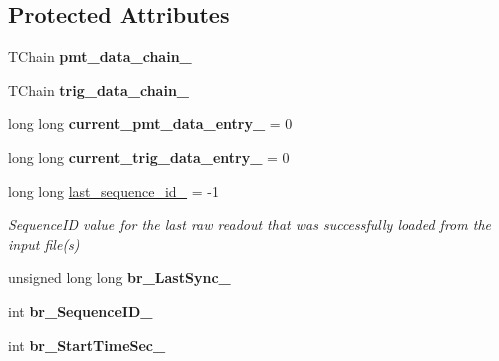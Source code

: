 \subsection*{Protected Attributes}
\begin{DoxyCompactItemize}
\item 
\hypertarget{classannie_1_1RawReader_a98cd23d90d4f3da64eb4a578e4f88593}{T\-Chain {\bfseries pmt\-\_\-data\-\_\-chain\-\_\-}}\label{classannie_1_1RawReader_a98cd23d90d4f3da64eb4a578e4f88593}

\item 
\hypertarget{classannie_1_1RawReader_abc8d869d88f8c0eaeefcebaada99ead9}{T\-Chain {\bfseries trig\-\_\-data\-\_\-chain\-\_\-}}\label{classannie_1_1RawReader_abc8d869d88f8c0eaeefcebaada99ead9}

\item 
\hypertarget{classannie_1_1RawReader_a74320bd489ace465896916242095a282}{long long {\bfseries current\-\_\-pmt\-\_\-data\-\_\-entry\-\_\-} = 0}\label{classannie_1_1RawReader_a74320bd489ace465896916242095a282}

\item 
\hypertarget{classannie_1_1RawReader_a377a21599759cd5fb12696af7c446f37}{long long {\bfseries current\-\_\-trig\-\_\-data\-\_\-entry\-\_\-} = 0}\label{classannie_1_1RawReader_a377a21599759cd5fb12696af7c446f37}

\item 
\hypertarget{classannie_1_1RawReader_ace1edb420517746da31a9faf44143327}{long long \hyperlink{classannie_1_1RawReader_ace1edb420517746da31a9faf44143327}{last\-\_\-sequence\-\_\-id\-\_\-} = -\/1}\label{classannie_1_1RawReader_ace1edb420517746da31a9faf44143327}

\begin{DoxyCompactList}\small\item\em Sequence\-I\-D value for the last raw readout that was successfully loaded from the input file(s) \end{DoxyCompactList}\item 
\hypertarget{classannie_1_1RawReader_ac05c4706421b9f2a8108014be0f07eed}{unsigned long long {\bfseries br\-\_\-\-Last\-Sync\-\_\-}}\label{classannie_1_1RawReader_ac05c4706421b9f2a8108014be0f07eed}

\item 
\hypertarget{classannie_1_1RawReader_aadd19ea3eb067412ee1772697d0a3acd}{int {\bfseries br\-\_\-\-Sequence\-I\-D\-\_\-}}\label{classannie_1_1RawReader_aadd19ea3eb067412ee1772697d0a3acd}

\item 
\hypertarget{classannie_1_1RawReader_ae45f7cff8459f8c3018044fada7c3d5e}{int {\bfseries br\-\_\-\-Start\-Time\-Sec\-\_\-}}\label{classannie_1_1RawReader_ae45f7cff8459f8c3018044fada7c3d5e}


\end{DoxyCompactItemize}
